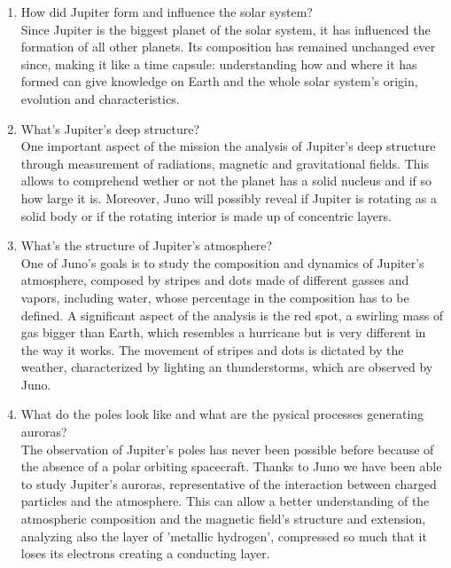 \begin{enumerate}
    \item How did Jupiter form and influence the solar system? \\
    Since Jupiter is the biggest planet of the solar system, it has influenced the formation of all other planets. Its composition has remained unchanged ever since, making it like a time capsule: understanding how and where it has formed can give knowledge on Earth and the whole solar system’s origin, evolution and characteristics. \\

 
    \item What's Jupiter's deep structure?\\
    One important aspect of the mission the analysis of Jupiter's deep structure through measurement of radiations, magnetic and gravitational fields. This allows to comprehend wether or not the planet has a solid nucleus and if so how large it is. Moreover, Juno will possibly reveal if Jupiter is rotating as a solid body or if the rotating interior is made up of concentric layers.\\

    \item What's the structure of Jupiter's atmosphere?\\
    One of Juno's goals is to study the composition and dynamics of Jupiter's atmosphere, composed by stripes and dots made of different gasses and vapors, including water, whose percentage in the composition has to be defined. A significant aspect of the analysis is the red spot, a swirling mass of gas bigger than Earth, which resembles a hurricane but is very different in the way it works. The movement of stripes and dots is dictated by the weather, characterized by lighting an thunderstorms, which are observed by Juno. \\

    \item What do the poles look like and what are the pysical processes generating auroras?\\
    The observation of Jupiter's poles has never been possible before because of the absence of a polar orbiting spacecraft. Thanks to Juno we have been able to study Jupiter's auroras, representative of the interaction between charged particles and the atmosphere. This can allow a better understanding of the atmospheric composition and the magnetic field's structure and extension, analyzing also the layer of 'metallic hydrogen', compressed so much that it loses its electrons creating a conducting layer. \\
\end{enumerate}


